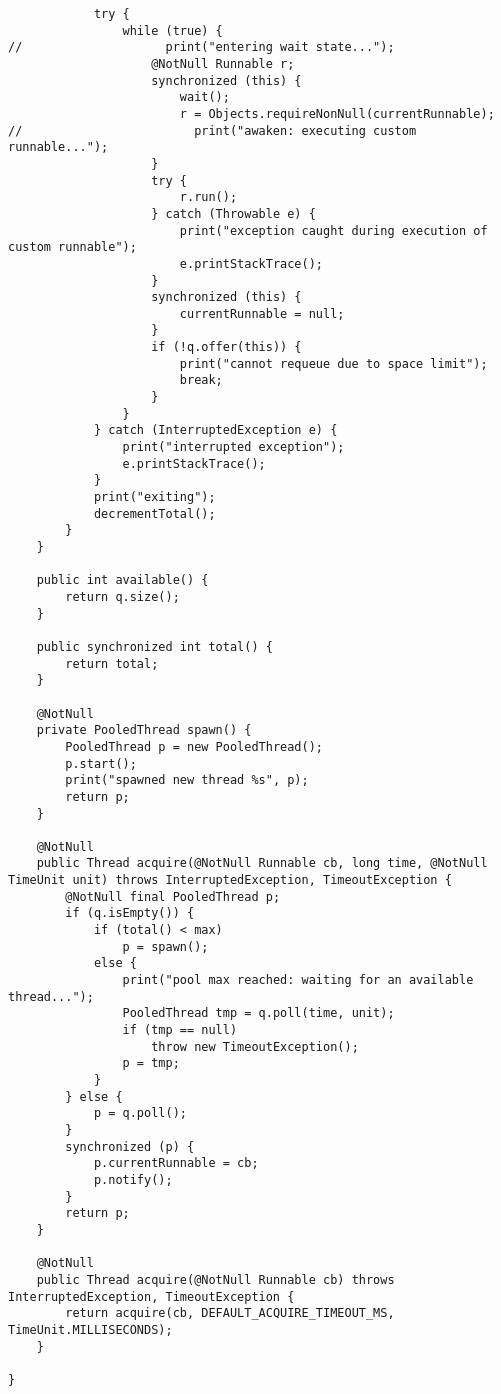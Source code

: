 \begin{lstlisting}
            try {
                while (true) {
//                    print("entering wait state...");
                    @NotNull Runnable r;
                    synchronized (this) {
                        wait();
                        r = Objects.requireNonNull(currentRunnable);
//                        print("awaken: executing custom runnable...");
                    }
                    try {
                        r.run();
                    } catch (Throwable e) {
                        print("exception caught during execution of custom runnable");
                        e.printStackTrace();
                    }
                    synchronized (this) {
                        currentRunnable = null;
                    }
                    if (!q.offer(this)) {
                        print("cannot requeue due to space limit");
                        break;
                    }
                }
            } catch (InterruptedException e) {
                print("interrupted exception");
                e.printStackTrace();
            }
            print("exiting");
            decrementTotal();
        }
    }

    public int available() {
        return q.size();
    }

    public synchronized int total() {
        return total;
    }

    @NotNull
    private PooledThread spawn() {
        PooledThread p = new PooledThread();
        p.start();
        print("spawned new thread %s", p);
        return p;
    }

    @NotNull
    public Thread acquire(@NotNull Runnable cb, long time, @NotNull TimeUnit unit) throws InterruptedException, TimeoutException {
        @NotNull final PooledThread p;
        if (q.isEmpty()) {
            if (total() < max)
                p = spawn();
            else {
                print("pool max reached: waiting for an available thread...");
                PooledThread tmp = q.poll(time, unit);
                if (tmp == null)
                    throw new TimeoutException();
                p = tmp;
            }
        } else {
            p = q.poll();
        }
        synchronized (p) {
            p.currentRunnable = cb;
            p.notify();
        }
        return p;
    }

    @NotNull
    public Thread acquire(@NotNull Runnable cb) throws InterruptedException, TimeoutException {
        return acquire(cb, DEFAULT_ACQUIRE_TIMEOUT_MS, TimeUnit.MILLISECONDS);
    }

}


\end{lstlisting}
 
